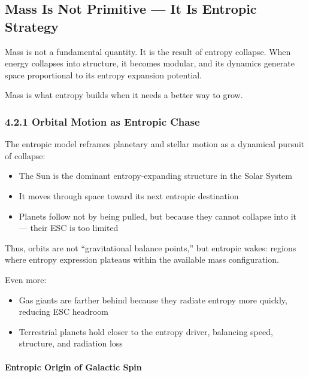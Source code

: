 \documentclass[12pt]{article}
\begin{document}
\subsection{Mass Is Not Primitive — It Is Entropic Strategy}

Mass is not a fundamental quantity. It is the result of entropy collapse. When energy collapses into structure, it becomes modular, and its dynamics generate space proportional to its entropy expansion potential.

Mass is what entropy builds when it needs a better way to grow.

\subsubsection*{4.2.1 Orbital Motion as Entropic Chase}

The entropic model reframes planetary and stellar motion as a dynamical pursuit of collapse:
\begin{itemize}
    \item The Sun is the dominant entropy-expanding structure in the Solar System
    \item It moves through space toward its next entropic destination
    \item Planets follow not by being pulled, but because they cannot collapse into it — their ESC is too limited
\end{itemize}

Thus, orbits are not ``gravitational balance points,'' but entropic wakes: regions where entropy expression plateaus within the available mass configuration.

Even more:
\begin{itemize}
    \item Gas giants are farther behind because they radiate entropy more quickly, reducing ESC headroom
    \item Terrestrial planets hold closer to the entropy driver, balancing speed, structure, and radiation loss
\end{itemize}

\paragraph{\textbf{Entropic Origin of Galactic Spin}}
\end{document}
